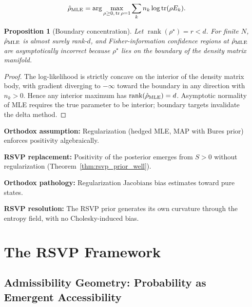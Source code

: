 \documentclass[11pt, openright, twoside]{book}
\theoremstyle{plain}
\newtheorem{proposition}[theorem]{Proposition}
\theoremstyle{definition}
\theoremstyle{remark}
\newcommand{\Sfield}{S}
\begin{document}
\begin{equation}
  \hat\rho_{\rm MLE} = \arg\max_{\rho\geq 0,\,\operatorname{tr}\rho=1}
  \sum_k n_k\log\operatorname{tr}(\rho E_k).
  \label{eq:mle_tomography}
\end{equation}

\begin{proposition}[Boundary concentration]
\label{prop:mle_boundary}
Let $\operatorname{rank}(\rho^\star)=r<d$. For finite $N$, $\hat\rho_{\rm MLE}$ is almost
surely rank-$d$, and Fisher-information confidence regions at $\hat\rho_{\rm MLE}$ are
asymptotically incorrect because $\rho^\star$ lies on the boundary of the density matrix manifold.
\end{proposition}

\begin{proof}
The log-likelihood is strictly concave on the interior of the density matrix body, with
gradient diverging to $-\infty$ toward the boundary in any direction with $n_k>0$. Hence
any interior maximum has $\operatorname{rank}(\hat\rho_{\rm MLE})=d$. Asymptotic normality
of MLE requires the true parameter to be interior; boundary targets invalidate the delta method.
\end{proof}

\begin{compbox}
\textbf{Orthodox assumption:} Regularization (hedged MLE, MAP with Bures prior) enforces
positivity algebraically.

\textbf{RSVP replacement:} Positivity of the posterior emerges from $\Sfield>0$ without
regularization (Theorem~\ref{thm:rsvp_prior_well}).

\textbf{Orthodox pathology:} Regularization Jacobians bias estimates toward pure states.

\textbf{RSVP resolution:} The RSVP prior generates its own curvature through the entropy
field, with no Cholesky-induced bias.
\end{compbox}

\part{The RSVP Framework}

\chapter{Admissibility Geometry: Probability as Emergent Accessibility}
\label{ch:admissibility}
\end{document}
